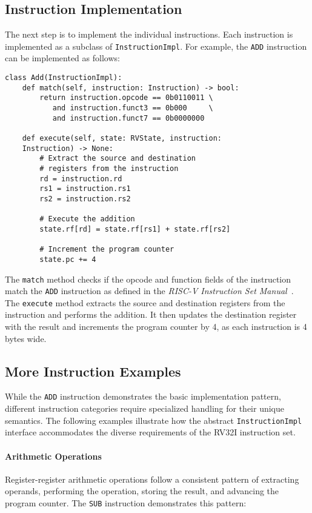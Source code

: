 \documentclass[sigconf]{acmart}
\begin{document}
\subsection{Instruction Implementation}\label{sec:instruction-implementation}
The next step is to implement the individual instructions. Each instruction is implemented as a subclass of \texttt{InstructionImpl}.
For example, the \texttt{ADD} instruction can be implemented as follows:
\begin{verbatim}
class Add(InstructionImpl):
    def match(self, instruction: Instruction) -> bool:
        return instruction.opcode == 0b0110011 \
           and instruction.funct3 == 0b000     \
           and instruction.funct7 == 0b0000000
    
    def execute(self, state: RVState, instruction: 
    Instruction) -> None:
        # Extract the source and destination 
        # registers from the instruction
        rd = instruction.rd
        rs1 = instruction.rs1
        rs2 = instruction.rs2

        # Execute the addition
        state.rf[rd] = state.rf[rs1] + state.rf[rs2]

        # Increment the program counter
        state.pc += 4
\end{verbatim}
The \texttt{match} method checks if the opcode and function fields of the instruction match the \texttt{ADD} instruction as defined in the \textit{RISC-V Instruction Set Manual}~\cite{riscv-spec}.
The \texttt{execute} method extracts the source and destination registers from the instruction and performs the addition. It then updates the destination register with the result and increments the program counter by 4, as each instruction is 4 bytes wide.

\subsection{More Instruction Examples}
While the \texttt{ADD} instruction demonstrates the basic implementation pattern, different instruction categories require specialized handling for their unique semantics. The following examples illustrate how the abstract \texttt{InstructionImpl} interface accommodates the diverse requirements of the RV32I instruction set.

\paragraph{Arithmetic Operations}
Register-register arithmetic operations follow a consistent pattern of extracting operands, performing the operation, storing the result, and advancing the program counter. The \texttt{SUB} instruction demonstrates this pattern:
\end{document}
